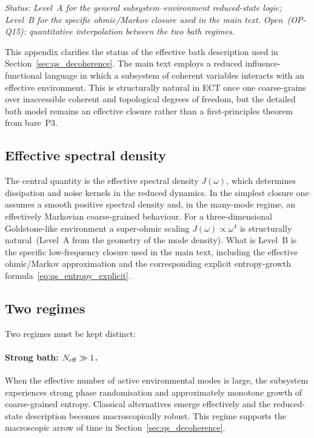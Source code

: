 \textit{Status: Level~A for the general subsystem--environment reduced-state
logic; Level~B for the specific ohmic/Markov closure used in the main text.
Open~(OP-Q15): quantitative interpolation between the two bath regimes.}

\medskip
This appendix clarifies the status of the effective bath description used
in Section~\ref{sec:qs_decoherence}.
The main text employs a reduced influence-functional language in which a
subsystem of coherent variables interacts with an effective environment.
This is structurally natural in ECT once one coarse-grains over
inaccessible coherent and topological degrees of freedom, but the detailed
bath model remains an effective closure rather than a first-principles
theorem from bare~P3.

\subsection*{Effective spectral density}

The central quantity is the effective spectral density $J(\omega)$,
which determines dissipation and noise kernels in the reduced dynamics.
In the simplest closure one assumes a smooth positive spectral density
and, in the many-mode regime, an effectively Markovian coarse-grained
behaviour.
For a three-dimensional Goldstone-like environment a super-ohmic scaling
$J(\omega)\propto\omega^4$ is structurally natural~(Level~A from the
geometry of the mode density).
What is Level~B is the specific low-frequency closure used in the main
text, including the effective ohmic/Markov approximation and the
corresponding explicit entropy-growth formula~\eqref{eq:qs_entropy_explicit}.

\subsection*{Two regimes}

Two regimes must be kept distinct:

\paragraph{Strong bath: $N_{\rm eff}\gg 1$.}
When the effective number of active environmental modes is large, the
subsystem experiences strong phase randomisation and approximately
monotone growth of coarse-grained entropy.
Classical alternatives emerge effectively and the reduced-state
description becomes macroscopically robust.
This regime supports the macroscopic arrow of time in
Section~\ref{sec:qs_decoherence}.

